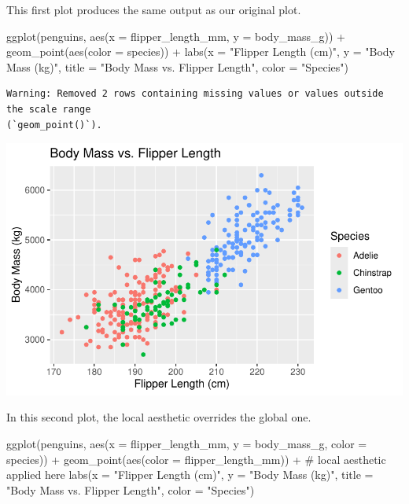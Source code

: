 \documentclass[
  letterpaper,
  DIV=11,
  numbers=noendperiod]{scrreprt}
\newenvironment{Shaded}{\begin{snugshade}}{\end{snugshade}}
\newcommand{\AttributeTok}[1]{\textcolor[rgb]{0.40,0.45,0.13}{#1}}
\newcommand{\CommentTok}[1]{\textcolor[rgb]{0.37,0.37,0.37}{#1}}
\newcommand{\FunctionTok}[1]{\textcolor[rgb]{0.28,0.35,0.67}{#1}}
\newcommand{\NormalTok}[1]{\textcolor[rgb]{0.00,0.23,0.31}{#1}}
\newcommand{\SpecialCharTok}[1]{\textcolor[rgb]{0.37,0.37,0.37}{#1}}
\newcommand{\StringTok}[1]{\textcolor[rgb]{0.13,0.47,0.30}{#1}}
\begin{document}
This first plot produces the same output as our original plot.

\begin{Shaded}
\begin{Highlighting}[]
\FunctionTok{ggplot}\NormalTok{(penguins, }\FunctionTok{aes}\NormalTok{(}\AttributeTok{x =}\NormalTok{ flipper\_length\_mm, }\AttributeTok{y =}\NormalTok{ body\_mass\_g)) }\SpecialCharTok{+}
  \FunctionTok{geom\_point}\NormalTok{(}\FunctionTok{aes}\NormalTok{(}\AttributeTok{color =}\NormalTok{ species)) }\SpecialCharTok{+}
  \FunctionTok{labs}\NormalTok{(}\AttributeTok{x =} \StringTok{"Flipper Length (cm)"}\NormalTok{, }\AttributeTok{y =} \StringTok{"Body Mass (kg)"}\NormalTok{,}
       \AttributeTok{title =} \StringTok{"Body Mass vs. Flipper Length"}\NormalTok{,}
       \AttributeTok{color =} \StringTok{"Species"}\NormalTok{)}
\end{Highlighting}
\end{Shaded}

\begin{verbatim}
Warning: Removed 2 rows containing missing values or values outside the scale range
(`geom_point()`).
\end{verbatim}

\includegraphics{scripts/02_dataViz/class4_files/figure-pdf/local_aesthetics-1.pdf}

In this second plot, the local aesthetic overrides the global one.

\begin{Shaded}
\begin{Highlighting}[]
\FunctionTok{ggplot}\NormalTok{(penguins, }\FunctionTok{aes}\NormalTok{(}\AttributeTok{x =}\NormalTok{ flipper\_length\_mm, }\AttributeTok{y =}\NormalTok{ body\_mass\_g, }\AttributeTok{color =}\NormalTok{ species)) }\SpecialCharTok{+}
  \FunctionTok{geom\_point}\NormalTok{(}\FunctionTok{aes}\NormalTok{(}\AttributeTok{color =}\NormalTok{ flipper\_length\_mm)) }\SpecialCharTok{+} \CommentTok{\# local aesthetic applied here}
  \FunctionTok{labs}\NormalTok{(}\AttributeTok{x =} \StringTok{"Flipper Length (cm)"}\NormalTok{, }\AttributeTok{y =} \StringTok{"Body Mass (kg)"}\NormalTok{,}
       \AttributeTok{title =} \StringTok{"Body Mass vs. Flipper Length"}\NormalTok{,}
       \AttributeTok{color =} \StringTok{"Species"}\NormalTok{)}
\end{Highlighting}
\end{Shaded}
\end{document}
